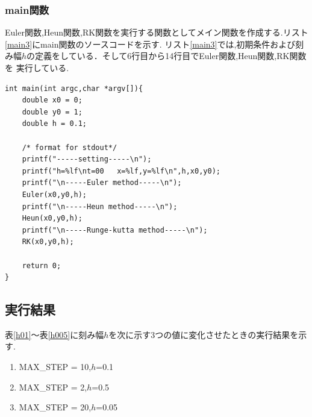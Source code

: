 \documentclass[dvipdfmx]{jarticle}
\begin{document}
      \subsubsection{main関数}
      Euler関数,Heun関数,RK関数を実行する関数としてメイン関数を作成する.リスト\ref{main3}にmain関数のソースコードを示す.
      リスト\ref{main3}では,初期条件および刻み幅$h$の定義をしている．そして6行目から14行目でEuler関数,Heun関数,RK関数を
      実行している.
      \begin{lstlisting}[basicstyle=\ttfamily\footnotesize, frame=single,label=main3,caption=main関数]
int main(int argc,char *argv[]){
    double x0 = 0;
    double y0 = 1;
    double h = 0.1;

    /* format for stdout*/
    printf("-----setting-----\n");
    printf("h=%lf\nt=00   x=%lf,y=%lf\n",h,x0,y0);
    printf("\n-----Euler method-----\n");
    Euler(x0,y0,h);
    printf("\n-----Heun method-----\n");
    Heun(x0,y0,h);
    printf("\n-----Runge-kutta method-----\n");
    RK(x0,y0,h);
    
    return 0;
}
            \end{lstlisting}      

    \subsection{実行結果}
    表\ref{h01}～表\ref{h005}に刻み幅$h$を次に示す3つの値に変化させたときの実行結果を示す.
    \begin{enumerate}
      \item MAX\_STEP = 10,$h$=0.1
      \item MAX\_STEP = 2,$h$=0.5
      \item MAX\_STEP = 20,$h$=0.05
    \end{enumerate}
\end{document}
